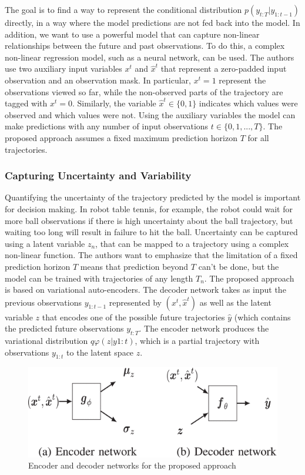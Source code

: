 The goal is to find a way to represent the conditional distribution
$p(y_{t:T} | y_{1:t−1})$ directly, in a way where the model
predictions are not fed back into the model. In addition, we want to use
a powerful model that can capture non-linear relationships between the
future and past observations. To do this, a complex non-linear
regression model, such as a neural network, can be used. The authors use
two auxiliary input variables $x^{t}$ and $\hat x^{t}$ that
represent a zero-padded input observation and an observation mask. In
particular, $x^{t} = 1$ represent the observations viewed so far,
while the non-observed parts of the trajectory are tagged with
$x^{t} = 0$. Similarly, the variable $\hat x^{t} \in \{0, 1\}$
indicates which values were observed and which values were not. Using
the auxiliary variables the model can make predictions with any number
of input observations $t \in \{0, 1,...,T\} $. The proposed approach
assumes a fixed maximum prediction horizon $T$ for all trajectories.

\subsubsection{Capturing Uncertainty and Variability}\label{header-n965}

Quantifying the uncertainty of the trajectory predicted by the model is
important for decision making. In robot table tennis, for example, the
robot could wait for more ball observations if there is high uncertainty
about the ball trajectory, but waiting too long will result in failure
to hit the ball. Uncertainty can be captured using a latent variable
$z_n$, that can be mapped to a trajectory using a complex non-linear
function. The authors want to emphasize that the limitation of a fixed
prediction horizon $T$ means that prediction beyond $T$ can't be
done, but the model can be trained with trajectories of any length
$T_n$. The proposed approach is based on variational auto-encoders.
The decoder network takes as input the previous observations
$y_{1:t−1}$ represented by $(x^{t} , \hat x^{t} )$ as well as the
latent variable $z$ that encodes one of the possible future
trajectories $\hat y$ (which contains the predicted future
observations $y_{t:T}$. The encoder network produces the variational
distribution $q\varphi(z | y1:t)$, which is a partial trajectory with
observations $y_{1:t}$ to the latent space $z$.

\begin{figure}[h!]
\centering
\includegraphics[width=0.8\linewidth]{images/encdec.png}
\caption{Encoder and decoder networks for the proposed approach}
\end{figure}

